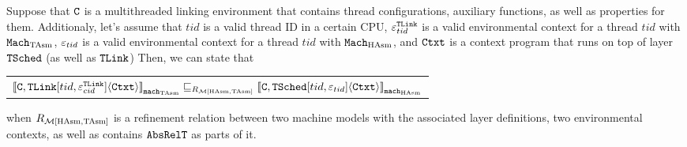 \begin{lemma}
\label{lemma:chapter:conlink:tasm-refines-hasm}
Suppose that ${{\mathrm{\texttt{C}}}}$ is a multithreaded linking environment that contains thread configurations, auxiliary functions, as well as properties for them. 
Additionaly, let's assume that 
$tid$ is a valid thread ID in a certain CPU,
  ${\varepsilon}^{{{\mathrm{\texttt{TLink}}}}}_{tid}$ is a valid
environmental context for a thread $tid$ with ${\mathrm{\texttt{Mach}}}_{\mathrm{TAsm}}$,
 ${\varepsilon}_{tid}$ is a valid
environmental context for a thread $tid$ with ${\mathrm{\texttt{Mach}}}_{\mathrm{HAsm}}$,
and ${\mathrm{\texttt{Ctxt}}}$ is a
context program that runs on top of layer ${{\mathrm{\texttt{TSched}}}}$ (as well as ${{\mathrm{\texttt{TLink}}}}$)
 Then, we can state that
 \begin{center}
\begin{tabular}{c}
${[\![{{{\mathrm{\texttt{C}}}}, {{\mathrm{\texttt{TLink}}}}[tid, {\varepsilon}^{{{\mathrm{\texttt{TLink}}}}}_{cid}]} \langle {{\mathrm{\texttt{Ctxt}}}} \rangle]\!]}_{{\mathrm{\texttt{mach}}}_{\mathrm{TAsm}}} \sqsubseteq_{R_{\mathcal{M}{[\mathrm{HAsm}, \mathrm{TAsm}]}}} {[\![{{{\mathrm{\texttt{C}}}}, {{\mathrm{\texttt{TSched}}}}[tid, {\varepsilon}_{tid}]} \langle {{\mathrm{\texttt{Ctxt}}}} \rangle]\!]}_{{{\mathrm{\texttt{mach}}}_{\mathrm{HAsm}}}}$\\
\end{tabular}
\end{center}
when $R_{\mathcal{M}{[\mathrm{HAsm}, \mathrm{TAsm}]}}$ is a refinement relation between two machine models with the associated layer definitions,
 two environmental contexts,
as well as contains ${{\mathrm{\texttt{AbsRelT}}}}$ as parts of it.
\end{lemma}

